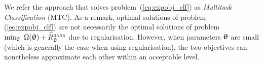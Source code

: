 We refer the approach that solves problem~(\ref{eq:expobj_clf}) as \emph{Multitask Classification} (MTC). %
As a remark, optimal solutions of problem (\ref{eq:expobj_clf}) are not necessarily the optimal solutions 
of problem $\min_{\bm{\uptheta}} \ \Omega({\bm{\uptheta}}) + \widetilde R_{{\bm{\uptheta}}}^{\textsc{rank}}$ due to regularisation. %
However, when parameters ${\bm{\uptheta}}$ are small (which is generally the case when using regularisation), the two objectives 
can nonetheless approximate each other within an acceptable level.





%


